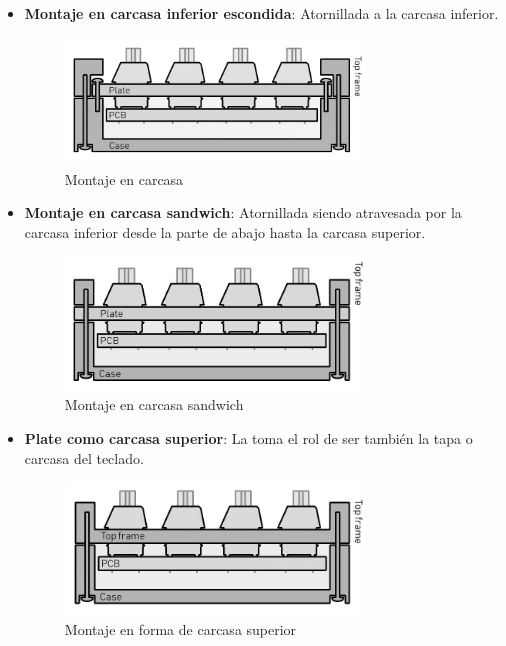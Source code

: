 \begin{itemize}
    \item \textbf{Montaje en carcasa inferior escondida}: Atornillada a la carcasa inferior.
    \begin{figure}[H]
        \centering
        \includegraphics[width=0.75\textwidth]{imagenes/Capitulos/Cap03/Montajes/Montaje3.png}
        \caption{Montaje en carcasa \cite{Keyboards-Mounting-Styles}}
        \label{fig:Montaje3}
    \end{figure}
    
    \item \textbf{Montaje en carcasa sandwich}: Atornillada siendo atravesada por la carcasa inferior desde la parte de abajo hasta la carcasa superior.
    \begin{figure}[H]
        \centering
        \includegraphics[width=0.75\textwidth]{imagenes/Capitulos/Cap03/Montajes/Montaje4.png}
        \caption{Montaje en carcasa sandwich \cite{Keyboards-Mounting-Styles}}
        \label{fig:Montaje4}
    \end{figure}
    
    \item \textbf{\gls{Plate} como carcasa superior}: La  toma el rol de ser también la tapa o carcasa del teclado.
    \begin{figure}[H]
        \centering
        \includegraphics[width=0.75\textwidth]{imagenes/Capitulos/Cap03/Montajes/Montaje5.png}
        \caption{Montaje en forma de carcasa superior \cite{Keyboards-Mounting-Styles}}
        \label{fig:Montaje5}
    \end{figure}
    

\end{itemize}
